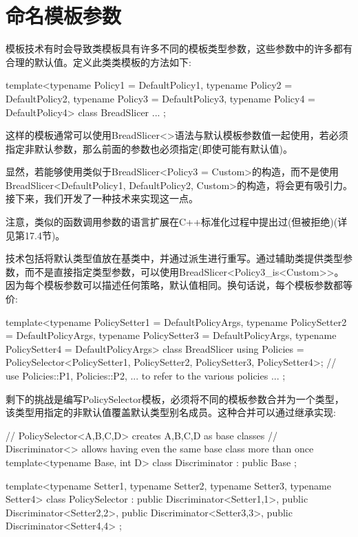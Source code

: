 \section{命名模板参数}
模板技术有时会导致类模板具有许多不同的模板类型参数，这些参数中的许多都有合理的默认值。定义此类类模板的方法如下:

\begin{cpp}
template<typename Policy1 = DefaultPolicy1,
		typename Policy2 = DefaultPolicy2,
		typename Policy3 = DefaultPolicy3,
		typename Policy4 = DefaultPolicy4>
class BreadSlicer {
	...
};
\end{cpp}

这样的模板通常可以使用BreadSlicer<>语法与默认模板参数值一起使用，若必须指定非默认参数，那么前面的参数也必须指定(即使可能有默认值)。

显然，若能够使用类似于BreadSlicer<Policy3 = Custom>的构造，而不是使用BreadSlicer<DefaultPolicy1, DefaultPolicy2, Custom>的构造，将会更有吸引力。接下来，我们开发了一种技术来实现这一点。

\begin{notice}
注意，类似的函数调用参数的语言扩展在C++标准化过程中提出过(但被拒绝)(详见第17.4节)。
\end{notice}

技术包括将默认类型值放在基类中，并通过派生进行重写。通过辅助类提供类型参数，而不是直接指定类型参数，可以使用BreadSlicer<Policy3\_is<Custom>{}>。因为每个模板参数可以描述任何策略，默认值相同。换句话说，每个模板参数都等价:

\begin{cpp}
template<typename PolicySetter1 = DefaultPolicyArgs,
		typename PolicySetter2 = DefaultPolicyArgs,
		typename PolicySetter3 = DefaultPolicyArgs,
		typename PolicySetter4 = DefaultPolicyArgs>
class BreadSlicer {
	using Policies = PolicySelector<PolicySetter1, PolicySetter2,
									PolicySetter3, PolicySetter4>;
	// use Policies::P1, Policies::P2, ... to refer to the various policies
	...
};
\end{cpp}

剩下的挑战是编写PolicySelector模板，必须将不同的模板参数合并为一个类型，该类型用指定的非默认值覆盖默认类型别名成员。这种合并可以通过继承实现:

\begin{cpp}
// PolicySelector<A,B,C,D> creates A,B,C,D as base classes
// Discriminator<> allows having even the same base class more than once
template<typename Base, int D>
class Discriminator : public Base {
};

template<typename Setter1, typename Setter2,
		typename Setter3, typename Setter4>
class PolicySelector : public Discriminator<Setter1,1>,
						public Discriminator<Setter2,2>,
						public Discriminator<Setter3,3>,
						public Discriminator<Setter4,4> {
};
\end{cpp}

